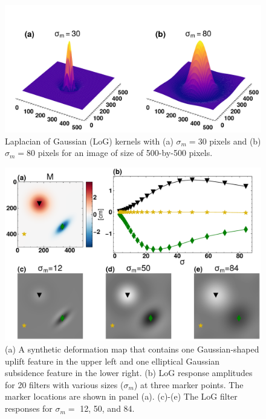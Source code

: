 \documentclass{utexasthesis}
\begin{document}
\begin{figure}[hbt!]
\centering
 \includegraphics[width=0.98\linewidth]{paper2/figures/figure1_log_examples.pdf}
\caption[Laplacian of Gaussian (LoG) kernels]{
Laplacian of Gaussian (LoG) kernels with (a) $\sigma_m=30$ pixels and (b) $\sigma_m=80$ pixels for an image of size of 500-by-500 pixels.
}
\label{fig:log-kernel}
%
\end{figure}

\begin{figure}[hbt!]
\centering
\includegraphics[width=0.98\linewidth]{paper2/figures/figure2_log_response.pdf}
\caption[LoG filter responses]{
(a) A synthetic deformation map that contains one Gaussian-shaped uplift feature in the upper left and one elliptical Gaussian subsidence feature in the lower right. (b) LoG response amplitudes for 20 filters with various sizes ($\sigma_m$) at three marker points. The marker locations are shown in panel (a). (c)-(e) The LoG filter responses for $\sigma_m=$ 12, 50, and 84.}
\label{fig:log-response}
%
\end{figure}
\end{document}
